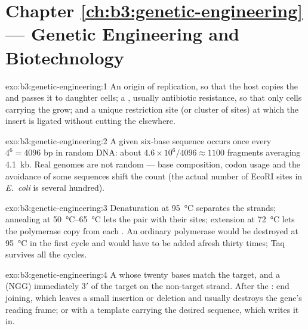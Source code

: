 \section*{Chapter \ref{ch:b3:genetic-engineering} --- Genetic Engineering and Biotechnology}

\begin{solution}{exo:b3:genetic-engineering:1}
An origin of replication, so that the host copies the  and
passes it to daughter cells; a , usually antibiotic
resistance, so that only cells carrying the  grow; and a unique
restriction site (or cluster of sites) at which the insert is ligated
without cutting the  elsewhere.
\end{solution}

\begin{solution}{exo:b3:genetic-engineering:2}
A given six-base sequence occurs once every $4^{6} = 4096$ bp in random
DNA: about $4.6\times 10^{6}/4096 \approx 1100$ fragments averaging
\qty{4.1}{kb}. Real genomes are not random --- base composition,
codon usage and the avoidance of some sequences shift the count (the
actual number of EcoRI sites in \emph{E.~coli} is several hundred).
\end{solution}

\begin{solution}{exo:b3:genetic-engineering:3}
Denaturation at \qty{95}{\celsius} separates the strands; annealing at
\qtyrange{50}{65}{\celsius} lets the  pair with their sites;
extension at \qty{72}{\celsius} lets the polymerase copy from each
. An ordinary polymerase would be destroyed at \qty{95}{\celsius}
in the first cycle and would have to be added afresh thirty times; Taq
survives all the cycles.
\end{solution}

\begin{solution}{exo:b3:genetic-engineering:4}
A  whose twenty bases match the target, and a  (NGG)
immediately 3$'$ of the target on the non-target strand. After the
: end joining, which leaves a small insertion or
deletion and usually destroys the gene's reading frame; or  with a template carrying the desired sequence, which
writes it in.
\end{solution}

